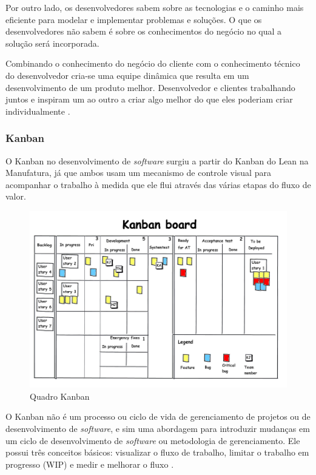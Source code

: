 Por outro lado, os desenvolvedores sabem sobre as tecnologias e o caminho mais eficiente para modelar e implementar problemas e soluções. O que os desenvolvedores não sabem é sobre os conhecimentos do negócio no qual a solução será incorporada. 

Combinando o conhecimento do negócio do cliente com o conhecimento técnico do desenvolvedor cria-se uma equipe dinâmica que resulta em um desenvolvimento de um produto melhor. Desenvolvedor e clientes trabalhando juntos e inspiram um ao outro a criar algo melhor do que eles poderiam criar individualmente \cite{hibbs2009}.


\subsubsection[Kanban]{Kanban}

O Kanban no desenvolvimento de \textit{software} surgiu a partir do Kanban do Lean na Manufatura, já que ambos usam um mecanismo de controle visual para acompanhar o trabalho à medida que ele flui através das várias etapas do fluxo de valor. 

\begin{figure}[H]
		\centering
		\label{fig05}
			\includegraphics[scale=0.7]{figuras/kanban.png}
		\caption{Quadro Kanban \cite{kanban}}
\end{figure}

O Kanban não é um processo ou ciclo de vida de gerenciamento de projetos ou de desenvolvimento de \textit{software}, e sim uma abordagem para introduzir mudanças em um ciclo de desenvolvimento de \textit{software} ou metodologia de gerenciamento. Ele possui três conceitos básicos: visualizar o fluxo de trabalho, limitar o trabalho em progresso (WIP) e medir e melhorar o fluxo \cite{kniberg2009}. 

